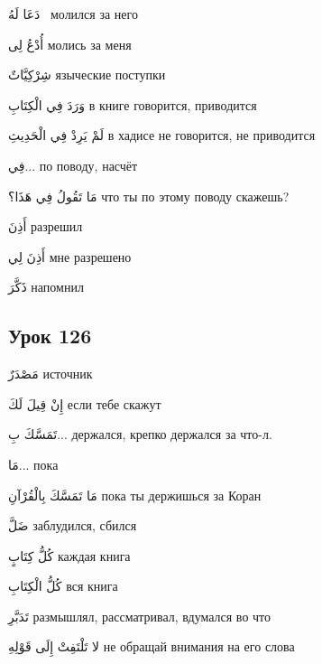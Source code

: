 \documentclass[a5paper]{article}
\newcommand\textstyleDropCaps[1]{#1}
\newcommand\textstyleCaptioncharacters[1]{#1}
\begin{document}
\textstyleCaptioncharacters{دَعَا لَهُ \ }\textstyleDropCaps{молился за него‎}

\textstyleCaptioncharacters{أُدْعُ لِى }\textstyleDropCaps{молись за меня‎}

\textstyleCaptioncharacters{شِرْكِيَّاتٌ }\textstyleDropCaps{языческие по­ступки‎}

\textstyleCaptioncharacters{وَرَدَ فِي الْكِتَابِ }\textstyleDropCaps{в кни­ге говорится, приводится ‎}

\textstyleCaptioncharacters{لَمْ يَرِدْ فِي الْحَدِيثِ }\textstyleDropCaps{в хадисе не говорится, не приводится ‎}

\textstyleCaptioncharacters{فِي... }\textstyleDropCaps{по поводу, насчёт‎}

\textstyleCaptioncharacters{مَا تَقُولُ فِي هَذَا؟ }\textstyleDropCaps{что ты по этому поводу скажешь? ‎}

\textstyleCaptioncharacters{أَذِنَ }\textstyleDropCaps{разрешил‎}

\textstyleCaptioncharacters{أَذِنَ لِي }\textstyleDropCaps{мне разрешено‎}

\textstyleCaptioncharacters{ذَكَّرَ }\textstyleDropCaps{напомнил‎}

\subsection[Урок 126‎]{\textstyleDropCaps{Урок 126‎}}
\textstyleCaptioncharacters{مَصْدَرٌ }\textstyleDropCaps{источник‎}

\textstyleCaptioncharacters{إِنْ قِيلَ لَكَ }\textstyleDropCaps{если тебе скажут‎}

\textstyleCaptioncharacters{تَمَسَّكَ بِ... }\textstyleDropCaps{держался, крепко держался за что-л.‎}

\textstyleCaptioncharacters{مَا... }\textstyleDropCaps{пока‎}

\textstyleCaptioncharacters{مَا تَمَسَّكَ بِالْقُرْآنِ }\textstyleDropCaps{пока ты держишься за Коран‎}

\textstyleCaptioncharacters{ضَلَّ }\textstyleDropCaps{заблудился, сбился‎}

\textstyleCaptioncharacters{كُلُّ كِتَابٍ }\textstyleDropCaps{каждая книга‎}

\textstyleCaptioncharacters{كُلُّ الْكِتَابِ }\textstyleDropCaps{вся книга‎}

\textstyleCaptioncharacters{تَدَبَّرِ }\textstyleDropCaps{размышлял, рассмат­ривал, вдумался во что‎}

\textstyleCaptioncharacters{لا تَلْتَفِتْ إِلَى قَوْلِهِ }\textstyleDropCaps{не обращай внимания на его слова ‎}
\end{document}

